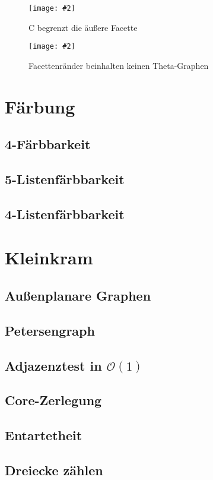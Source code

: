 \documentclass[10pt,a4paper]{article}
\makeatletter
\def\maxwidth#1{\ifdim\Gin@nat@width>#1 #1\else\Gin@nat@width\fi}
\newcommand{\imageFigure}[4]{%
    \begin{figure}[h]%
        \centering%
        {%
            \setlength{\fboxsep}{1pt}%
            \setlength{\fboxrule}{1pt}%
            \texttt{[image: \#2]}%
        }%
        \caption{#1}%
        \label{fig:#4}%
    \end{figure}%
}
\makeatother
\begin{document}
\imageFigure{C begrenzt die äußere Facette}{c-outer.png}{.7}{c-outer}
\imageFigure{Facettenränder beinhalten keinen Theta-Graphen}{face-no-theta.png}{.4}{face-no-theta}


\section{Färbung}
\subsection{4-Färbbarkeit}
\subsection{5-Listenfärbbarkeit}
\subsection{4-Listenfärbbarkeit}



\section{Kleinkram}
\subsection{Außenplanare Graphen}
\subsection{Petersengraph}
\subsection{Adjazenztest in $\mathcal{O}(1)$}
\subsection{Core-Zerlegung}
\subsection{Entartetheit}
\subsection{Dreiecke zählen}
\end{document}
